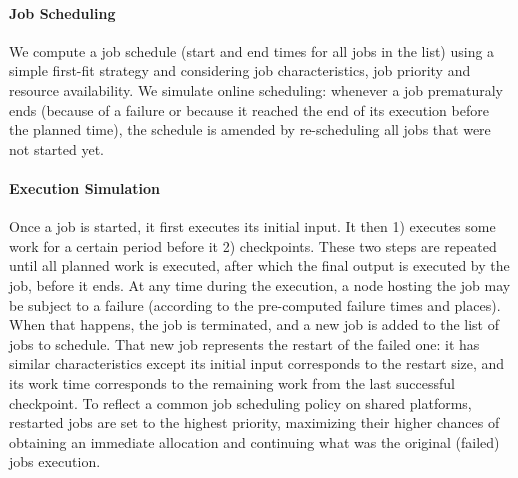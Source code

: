 \paragraph*{Job Scheduling}
We compute a job schedule (start and end times for all jobs in the list) using a
simple first-fit strategy and considering job characteristics, job priority and
resource availability.  We simulate online scheduling: whenever a job prematuraly
ends (because of a failure or because it reached the end of its execution before the
planned time), the schedule is amended by re-scheduling all jobs that were not
started yet.

\paragraph*{Execution Simulation}
Once a job is started, it first executes its initial input. It then 1) executes some
work for a certain period before it 2) checkpoints. These two steps are repeated
until all planned work is executed, after which the final output is executed by the
job, before it ends. At any time during the execution, a node hosting the job may be
subject to a failure (according to the pre-computed failure times and places). When
that happens, the job is terminated, and a new job is added to the list of jobs to
schedule. That new job represents the restart of the failed one: it has similar
characteristics except its initial input corresponds to the restart size, and its
work time corresponds to the remaining work from the last successful checkpoint. To
reflect a common job scheduling policy on shared platforms, restarted jobs are set to
the highest priority, maximizing their higher chances of obtaining an immediate
allocation and continuing what was the original (failed) jobs execution.

